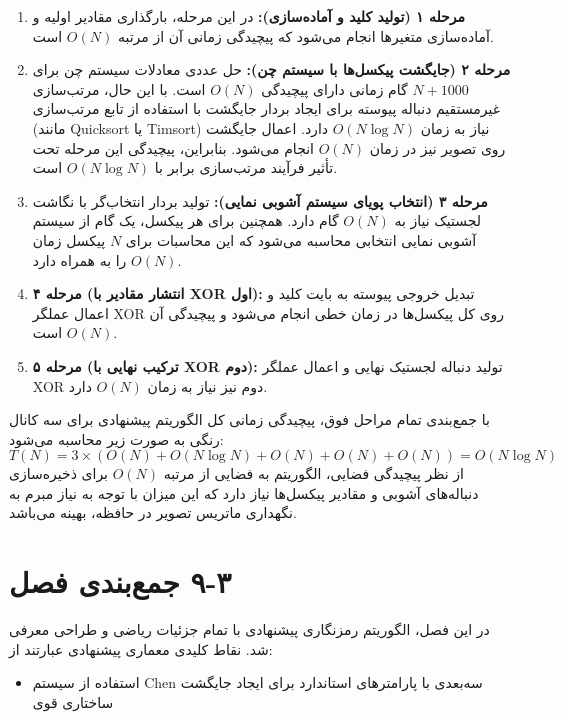 \begin{enumerate}
    \item \textbf{مرحله ۱ (تولید کلید و آماده‌سازی):} در این مرحله، بارگذاری مقادیر اولیه و آماده‌سازی متغیرها انجام می‌شود که پیچیدگی زمانی آن از مرتبه $O(N)$ است.
    \item \textbf{مرحله ۲ (جایگشت پیکسل‌ها با سیستم چن):} حل عددی معادلات سیستم چن برای $N + 1000$ گام زمانی دارای پیچیدگی $O(N)$ است. با این حال، مرتب‌سازی غیرمستقیم دنباله پیوسته برای ایجاد بردار جایگشت با استفاده از تابع مرتب‌سازی (مانند Quicksort یا Timsort) نیاز به زمان $O(N \log N)$ دارد. اعمال جایگشت روی تصویر نیز در زمان $O(N)$ انجام می‌شود. بنابراین، پیچیدگی این مرحله تحت تأثیر فرآیند مرتب‌سازی برابر با $O(N \log N)$ است.
    \item \textbf{مرحله ۳ (انتخاب پویای سیستم آشوبی نمایی):} تولید بردار انتخاب‌گر با نگاشت لجستیک نیاز به $O(N)$ گام دارد. همچنین برای هر پیکسل، یک گام از سیستم آشوبی نمایی انتخابی محاسبه می‌شود که این محاسبات برای $N$ پیکسل زمان $O(N)$ را به همراه دارد.
    \item \textbf{مرحله ۴ (انتشار مقادیر با XOR اول):} تبدیل خروجی پیوسته به بایت کلید و اعمال عملگر XOR روی کل پیکسل‌ها در زمان خطی انجام می‌شود و پیچیدگی آن $O(N)$ است.
    \item \textbf{مرحله ۵ (ترکیب نهایی با XOR دوم):} تولید دنباله لجستیک نهایی و اعمال عملگر XOR دوم نیز نیاز به زمان $O(N)$ دارد.
\end{enumerate}

با جمع‌بندی تمام مراحل فوق، پیچیدگی زمانی کل الگوریتم پیشنهادی برای سه کانال رنگی به صورت زیر محاسبه می‌شود:
\begin{equation}
T(N) = 3 \times \left( O(N) + O(N \log N) + O(N) + O(N) + O(N) \right) = O(N \log N)

\end{equation}
از نظر پیچیدگی فضایی، الگوریتم به فضایی از مرتبه $O(N)$ برای ذخیره‌سازی دنباله‌های آشوبی و مقادیر پیکسل‌ها نیاز دارد که این میزان با توجه به نیاز مبرم به نگهداری ماتریس تصویر در حافظه، بهینه می‌باشد.

\section{‏۳‏-‏۹‏ جمع‌بندی فصل}

در این فصل، الگوریتم رمزنگاری پیشنهادی با تمام جزئیات ریاضی و طراحی معرفی شد. نقاط کلیدی معماری پیشنهادی عبارتند از:

\begin{itemize}
    \item استفاده از سیستم Chen سه‌بعدی با پارامترهای استاندارد برای ایجاد جایگشت ساختاری قوی
\end{itemize}

